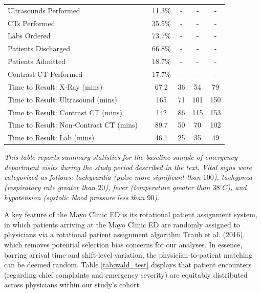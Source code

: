 \documentclass{article}
\begin{document}
\begin{table}[ht]
\begin{threeparttable}
\begin{tabular}{p{10cm}ccccc}
Ultrasounds Performed & & {11.3\%} & {-} & {-} & {-} \\
CTs Performed & & {35.5\%} & {-} & {-} & {-} \\
Labs Ordered & & {73.7\%} & {-} & {-} & {-} \\
Patients Discharged & & {66.8\%} & {-} & {-} & {-} \\
Patients Admitted & & {18.7\%} & {-} & {-} & {-} \\
Contrast CT Performed & & {17.7\%} & {-} & {-} & {-} \\
Time to Result: X-Ray (mins) & & {67.2} & {36} & {54} & {79} \\
Time to Result: Ultrasound (mins) & & {165} & {71} & {101} & {150} \\
Time to Result: Contrast CT (mins) & & {142} & {86} & {115} & {153} \\
Time to Result: Non-Contrast CT (mins) & & {89.7} & {50} & {70} & {102} \\
Time to Result: Lab (mins) & & {46.1} & {25} & {35} & {49} \\
\bottomrule
\end{tabular}
\begin{tablenotes}
\small
\item \textit{This table reports summary statistics for the baseline sample of emergency department visits during the study period described in the text. Vital signs were categorized as follows: tachycardia (pulse more significant than $100$), tachypnea (respiratory rate greater than $20$), fever (temperature greater than $38^\circ C$), and hypotension (systolic blood pressure less than $90$).}
\end{tablenotes}
\end{threeparttable}
\end{table}

A key feature of the Mayo Clinic ED is its rotational patient assignment
system, in which patients arriving at the Mayo Clinic ED are randomly
assigned to physicians via a rotational patient assignment algorithm
Traub et al. (2016), which removes potential selection bias concerns for
our analyses. In essence, barring arrival time and shift-level
variation, the physician-to-patient matching can be deemed random. Table
\ref{tab:wald_test} displays that patient encounters (regarding chief
complaints and emergency severity) are equitably distributed across
physicians within our study's cohort.
\end{document}
